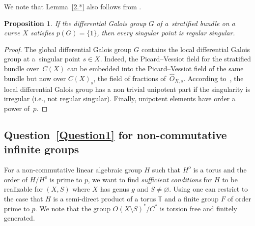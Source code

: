\documentclass[10pt,a4paper]{amsart}
\numberwithin{equation}{section}
\newtheorem{Proposition}[Theorem]{Proposition}
\begin{document}
 We note that Lemma~\ref{2.*} also follows from \cite[Lemma~2.5(a)]{Ki}.

\begin{Proposition}\label{2.2} If the differential Galois group $G$ of a~stratified bundle on a curve $X$ satisfies $p(G)=\{1\}$, then every singular point is regular singular.
\end{Proposition}

\begin{proof} The global differential Galois group $G$ contains the local differential Galois group at a~singular point $s\in X$. Indeed, the Picard--Vessiot field for the stratified bundle over~$C(X)$ can be embedded into the Picard--Vessiot field of the same bundle but now over $C(X)_s$, the field of fractions of~$\widehat{O}_{X,s}$. According to~\cite{Ma-vdP1}, the local differential Galois group has a non trivial unipotent part if the singularity is irregular (i.e., not regular singular). Finally, unipotent elements have order a power of~$p$.
\end{proof}

\subsection{Question~\ref{Question1} for non-commutative infinite groups}\label{section2.2}

 For a non-commutative linear algebraic group $H$ such that $H^o$ is a torus and the order of $H/H^o$ is prime to $p$,
 we want to find {\it sufficient conditions} for $H$ to be realizable for $(X,S)$ where $X$ has genus $g$ and $S\neq \varnothing$.
 Using \cite[Lemma 5.11]{B-S} one can restrict to the case that $H$ is a semi-direct product of a torus $\mathbb{T}$ and a finite group $F$ of order prime to $p$. We note that the group $O(X\setminus S)^*/C^*$ is torsion free and finitely generated.
\end{document}
